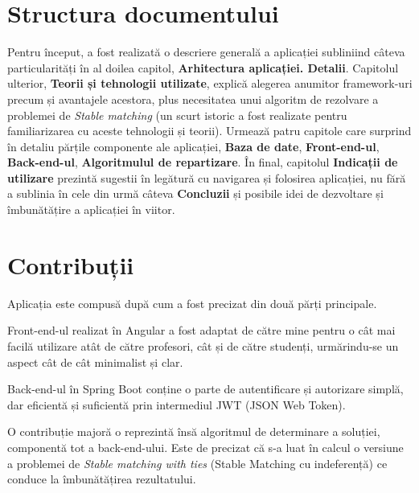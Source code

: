 \section{Structura documentului}

Pentru început, a fost realizată o descriere generală a aplicației subliniind câteva particularități în al doilea capitol, \textbf{Arhitectura aplicației. Detalii}.
Capitolul ulterior, \textbf{Teorii și tehnologii utilizate}, explică alegerea anumitor framework-uri precum și avantajele acestora, plus necesitatea unui algoritm de rezolvare a problemei de \textit{Stable matching} (un scurt istoric a fost realizate pentru familiarizarea cu aceste tehnologii și teorii).
Urmează patru capitole care surprind în detaliu părțile componente ale aplicației, \textbf{Baza de date}, \textbf{Front-end-ul}, \textbf{Back-end-ul}, \textbf{Algoritmulul de repartizare}.
În final, capitolul \textbf{Indicații de utilizare} prezintă sugestii în legătură cu navigarea și folosirea aplicației, nu fără a sublinia în cele din urmă câteva \textbf{Concluzii} și posibile idei de dezvoltare și îmbunătățire a aplicației în viitor.

\section{Contribuții}
Aplicația \textbf{\thesistitle} este compusă după cum a fost precizat din două părți principale.

Front-end-ul realizat în Angular a fost adaptat de către mine pentru o cât mai facilă utilizare atât de către profesori, cât și de către studenți, urmărindu-se un aspect cât de cât minimalist și clar.

Back-end-ul în Spring Boot conține o parte de autentificare și autorizare simplă, dar eficientă și suficientă prin intermediul JWT (JSON Web Token).

O contribuție majoră o reprezintă însă algoritmul de determinare a soluției, componentă tot a back-end-ului. Este de precizat că s-a luat în calcul o versiune a problemei de \textit{Stable matching with ties} (Stable Matching cu indeferență) ce conduce la îmbunătățirea rezultatului.